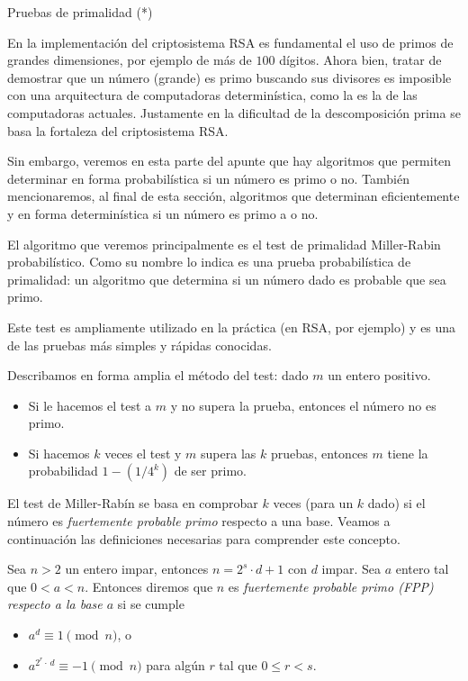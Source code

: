 \begin{section}{Pruebas de primalidad (*)}
    
En la implementación del  criptosistema RSA  es fundamental el uso de primos de grandes dimensiones, por ejemplo de más de $100$  dígitos. Ahora bien,  tratar de  demostrar que un número  (grande) es primo buscando sus divisores es imposible con una arquitectura de computadoras determinística,  como la es la de las computadoras actuales. Justamente en la dificultad de la descomposición prima se basa la fortaleza del criptosistema RSA. 

Sin embargo,  veremos en esta parte del apunte  que hay algoritmos que permiten determinar en forma probabilística si un número es primo o no. También mencionaremos, al final de esta sección, algoritmos que determinan eficientemente y en forma determinística si un número es primo a o no. 


El algoritmo que veremos principalmente es el test de primalidad Miller-Rabin probabilístico. Como su nombre lo indica  es una prueba probabilística de primalidad: un algoritmo que determina si un número dado es probable que sea primo.

Este test es ampliamente utilizado en la práctica (en RSA, por ejemplo) y es una de las pruebas más simples y rápidas conocidas.

Describamos en forma amplia el método del test: dado $m$ un entero positivo.
\begin{itemize} 
    \item Si le hacemos el test a $m$ y no supera la prueba, entonces el número no es primo. 
    \item Si hacemos $k$ veces el test y $m$ supera las $k$ pruebas, entonces  $m$ tiene la probabilidad $1 - ( 1 / 4^k)$ de ser primo. 
\end{itemize}

El test de  Miller-Rabín se basa en comprobar $k$ veces (para un $k$ dado) si el número es \textit{fuertemente probable primo} respecto a una base. Veamos a continuación las definiciones necesarias para comprender este concepto. 

\begin{definicion}
    Sea $n > 2$ un entero impar, entonces $n = 2^s \cdot d + 1$ con $d$ impar. Sea $a$ entero  tal que $0 < a < n$. Entonces diremos que $n$ es \textit{fuertemente probable primo (FPP) respecto a la base $a$} si se cumple
    \begin{itemize}
        \item $a^{d} \equiv 1 \pmod{n}$, o
        \item $a^{2^r\cdot\, d} \equiv -1 \pmod{n}$  para algún $r$ tal que $0 \le r < s$.
    \end{itemize}
\end{definicion}


\end{section}
